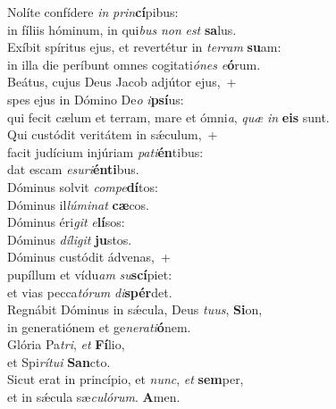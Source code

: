 \evenverse Nolíte confídere \textit{in} \textit{prin}\textbf{cí}pibus:~\*\\
\evenverse in fíliis hóminum, in qui\textit{bus} \textit{non} \textit{est} \textbf{sa}lus.\\
\oddverse Exíbit spíritus ejus, et revertétur in \textit{ter}\textit{ram} \textbf{su}am:~\*\\
\oddverse in illa die períbunt omnes cogitati\textit{ó}\textit{nes} \textit{e}\textbf{ó}rum.\\
\evenverse Beátus, cujus Deus Jacob adjútor ejus,~+\\
\evenverse  spes ejus in Dómino De\textit{o} \textit{i}\textbf{psí}us:~\*\\
\evenverse qui fecit cælum et terram, mare et ómni\textit{a}, \textit{quæ} \textit{in} \textbf{e}\textbf{is} sunt.\\
\oddverse Qui custódit veritátem in sǽculum,~+\\
\oddverse  facit judícium injúriam \textit{pa}\textit{ti}\textbf{én}tibus:~\*\\
\oddverse dat escam \textit{e}\textit{su}\textit{ri}\textbf{én}\textbf{ti}bus.\\
\evenverse Dóminus solvit \textit{com}\textit{pe}\textbf{dí}tos:~\*\\
\evenverse Dóminus il\textit{lú}\textit{mi}\textit{nat} \textbf{cæ}cos.\\
\oddverse Dóminus éri\textit{git} \textit{e}\textbf{lí}sos:~\*\\
\oddverse Dóminus \textit{dí}\textit{li}\textit{git} \textbf{ju}stos.\\
\evenverse Dóminus custódit ádvenas,~+\\
\evenverse  pupíllum et vídu\textit{am} \textit{su}\textbf{scí}piet:~\*\\
\evenverse et vias pecca\textit{tó}\textit{rum} \textit{di}\textbf{spér}det.\\
\oddverse Regnábit Dóminus in sǽcula, Deus \textit{tu}\textit{us}, \textbf{Si}on,~\*\\
\oddverse in generatiónem et ge\textit{ne}\textit{ra}\textit{ti}\textbf{ó}nem.\\
\evenverse Glória Pa\textit{tri}, \textit{et} \textbf{Fí}lio,~\*\\
\evenverse et Spi\textit{rí}\textit{tu}\textit{i} \textbf{San}cto.\\
\oddverse Sicut erat in princípio, et \textit{nunc}, \textit{et} \textbf{sem}per,~\*\\
\oddverse et in sǽcula sæ\textit{cu}\textit{ló}\textit{rum}. \textbf{A}men.\\

